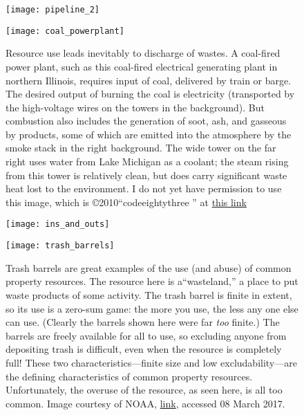 \documentclass[amstex,12pt]{book}
\begin{document}
\newpage
\begin{figure}[p]
\centering
  \texttt{[image: pipeline\_2]}%

\caption{ }
\label{fig:pipelines_2}
\end{figure}


\newpage
\begin{figure}[p]
\centering
  \texttt{[image: coal\_powerplant]}%

\caption{Resource use leads inevitably to  discharge of wastes. A coal-fired power plant, such as this coal-fired electrical generating plant in northern Illinois, requires input of coal, delivered by train or barge. The desired output of burning the coal is electricity (transported by the high-voltage wires on the towers in the background). But combustion also includes the generation of soot, ash, and gasseous by products, some of which are emitted into the atmosphere by the smoke stack in the right background. The wide tower on the far right uses water from Lake Michigan as a coolant; the steam rising from this tower is relatively clean, but does carry significant waste heat lost to the environment. I do not yet have permission to use this image, which is \copyright 2010``codeeightythree
'' at \href{https://www.flickr.com/photos/railpictures/4316794283/in/photostream/}{this link}}
\label{fig:coal_powerplant}
\end{figure}

\newpage
\begin{figure}[p]
\centering
  \texttt{[image: ins\_and\_outs]}%
\caption{}
\label{fig:ins_and_outs}
\end{figure}

\newpage
\begin{figure}[p]
\centering
  \texttt{[image: trash\_barrels]}%

\caption{Trash barrels are great examples of the use (and abuse) of common property resources. The resource here is a``wasteland,'' a place to put waste products of some activity. The trash barrel is finite in extent, so its use is a zero-sum game: the more you use, the less any one else can use. (Clearly the barrels shown here were far \emph{too} finite.) The barrels are freely available for all to use, so excluding anyone from depositing trash is difficult, even when the resource is completely full! These two characteristics---finite size and low excludability---are the defining characteristics of common property resources. Unfortunately, the overuse of the resource, as seen here, is all too common. Image courtesy of NOAA,  \href{https://marinedebrisblog.wordpress.com/tag/plastics/}{link}, accessed 08 March 2017.}
\label{fig:trash}
\end{figure}
\end{document}
